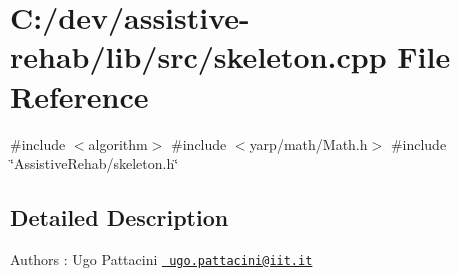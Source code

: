 \section{C\+:/dev/assistive-\/rehab/lib/src/skeleton.cpp File Reference}
\label{skeleton_8cpp}
{\ttfamily \#include $<$algorithm$>$}\newline
{\ttfamily \#include $<$yarp/math/\+Math.\+h$>$}\newline
{\ttfamily \#include \char`\"{}Assistive\+Rehab/skeleton.\+h\char`\"{}}\newline


\subsection{Detailed Description}
\begin{DoxyAuthor}{Authors}
\+: Ugo Pattacini \href{mailto:ugo.pattacini@iit.it}{\texttt{ ugo.\+pattacini@iit.\+it}} 
\end{DoxyAuthor}
